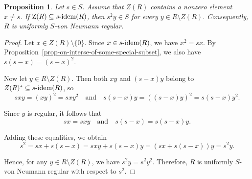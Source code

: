 \documentclass[12pt]{article}
\newtheorem{thm}{\bf Theorem}[section]
\newtheorem{prop}[thm]{\bf Proposition}
\def\Zero{\mathrm{Z}}
\def\idem{{\rm idem}}
\begin{document}
\begin{prop}
Let $s \in S$. Assume that $Z(R)$ contains a nonzero element $x \neq s$. If $\Zero(R) \subseteq s\text{-}\idem(R)$, then $s^2 y \in S$ for every $y \in R \setminus Z(R)$. Consequently, $R$ is uniformly $S$-von Neumann regular.
\end{prop}

\begin{proof}
Let \(x \in Z(R) \setminus \{0\}\). Since \(x \in s\text{-}\idem(R)\), we have \(x^2 = sx\).  
By Proposition~\ref{prop-on-interse-of-some-special-subset}, we also have $s(s-x) = (s-x)^2$.

Now let \(y \in R \setminus Z(R)\). Then both \(xy\) and \((s-x)y\) belong to \(Z(R)^* \subseteq s\text{-}\idem(R)\), so
\[
s xy = (xy)^2 = sxy^2 \quad \text{and} \quad s (s-x)y = ((s-x)y)^2 = s (s-x)y^2.
\]

Since \(y\) is regular, it follows that
\[
sx = sxy \quad \text{and} \quad s(s-x) = s (s-x)y.
\]

Adding these equalities, we obtain
\[
s^2 = sx + s(s-x) = sxy + s(s-x)y = (sx + s(s-x))y = s^2 y.
\]

Hence, for any \(y \in R \setminus Z(R)\), we have \(s^2y = s^2y^2\). Therefore, \(R\) is uniformly \(S\)-von Neumann regular with respect to \(s^2\).
\end{proof}









\end{document}
